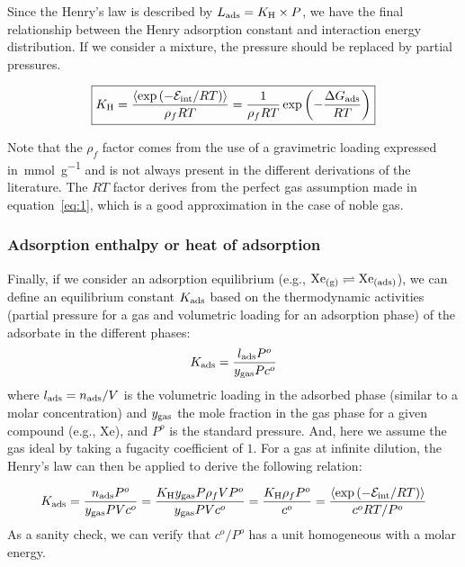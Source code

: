 \documentclass[main.tex]{subfiles}
\begin{document}
Since the Henry's law is described by $L_{\text{ads}}=K_{\text{H}} \times P$, we have the final relationship between the Henry adsorption constant and interaction energy distribution. If we consider a mixture, the pressure should be replaced by partial pressures.

\begin{equation}\label{eq:henry}
    \boxed{
    K_{\text{H}} = \dfrac{\langle \exp\left(-\mathcal{E}_{\text{int}}/RT\right) \rangle}{\rho_f RT} = \dfrac{1}{\rho_f RT} \exp\left(-\dfrac{\Delta G_{\text{ads}}}{RT}\right)
    }
\end{equation}

Note that the $\rho_f$ factor comes from the use of a gravimetric loading expressed in~\si{\milli\mole\per\gram} and is not always present in the different derivations of the literature.\autocite{PoreBlazer} The $RT$ factor derives from the perfect gas assumption made in equation~\ref{eq:1}, which is a good approximation in the case of noble gas. 


\subsubsection{Adsorption enthalpy or heat of adsorption}

Finally, if we consider an adsorption equilibrium (e.g., $\text{Xe}_{\text{(g)}} \rightleftharpoons \text{Xe}_{\text{(ads)}}$), we can define an equilibrium constant $K_{\text{ads}}$ based on the thermodynamic activities (partial pressure for a gas and volumetric loading for an adsorption phase) of the adsorbate in the different phases:
\begin{equation}
  K_{\text{ads}} = \dfrac{l_{\text{ads}}P^o}{y_{\text{gas}}Pc^o}
\end{equation}
where $l_{\text{ads}}=n_{\text{ads}}/V$ is the volumetric loading in the adsorbed phase (similar to a molar concentration) and $y_{\text{gas}}$ the mole fraction in the gas phase for a given compound (e.g., Xe), and $P^o$ is the standard pressure. And, here we assume the gas ideal by taking a fugacity coefficient of $1$. For a gas at infinite dilution, the Henry's law can then be applied to derive the following relation:

\begin{equation}\label{eq:eq_cst}
  K_{\text{ads}} = \dfrac{n_{\text{ads}}P^o}{y_{\text{gas}}PVc^o} = \dfrac{K_{\text{H}}y_{\text{gas}}P\rho_f V P^o}{y_{\text{gas}}PVc^o} = \dfrac{K_{\text{H}}\rho_f P^o}{c^o} = \dfrac{\langle \exp\left(-\mathcal{E}_{\text{int}}/RT\right) \rangle}{c^o RT/P^o}
\end{equation}
As a sanity check, we can verify that $c^o/P^o$ has a unit homogeneous with a molar energy.
\end{document}
